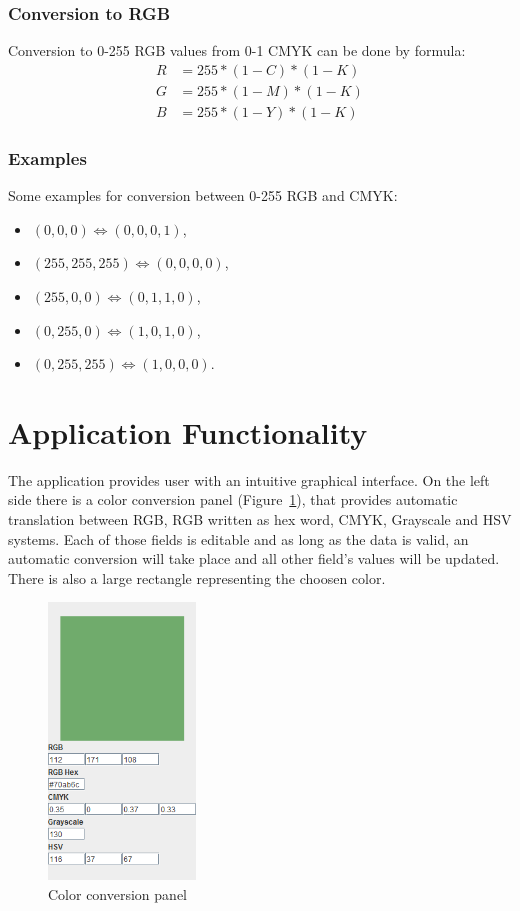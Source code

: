 \documentclass[titlepage]{article}
\begin{document}
\subsubsection{Conversion to RGB}
Conversion to 0-255 RGB values from 0-1 CMYK can be done by formula:
\begin{equation}
\begin{split}
R&=255*(1-C)*(1-K)\\
G&=255*(1-M)*(1-K)\\
B&=255*(1-Y)*(1-K)
\end{split}
\end{equation}

\subsubsection{Examples}
Some examples for conversion between 0-255 RGB and CMYK:
\begin{itemize}
  \item $(0, 0, 0) \Leftrightarrow (0, 0, 0, 1)$,
  \item $(255, 255, 255) \Leftrightarrow (0, 0, 0, 0)$,
  \item $(255, 0, 0) \Leftrightarrow (0, 1, 1, 0)$,
  \item $(0, 255, 0) \Leftrightarrow (1, 0, 1, 0)$,
  \item $(0, 255, 255) \Leftrightarrow (1, 0, 0, 0)$.
\end{itemize}

\clearpage
\section{Application Functionality}
The application provides user with an intuitive graphical interface. On the left
side there is a color conversion panel (Figure~\ref{fig:conv}), that provides
automatic translation between RGB, RGB written as hex word, CMYK, Grayscale and
HSV systems. Each of those fields is editable and as long as the data is valid,
an automatic conversion will take place and all other field's values will be
updated. There is also a large rectangle representing the choosen color.

\begin{figure}[!htb]
	\centering
	\includegraphics[width=0.35\textwidth]{img/conversion.png} 
	\caption{Color conversion panel}
	\label{fig:conv}
\end{figure}
\end{document}
